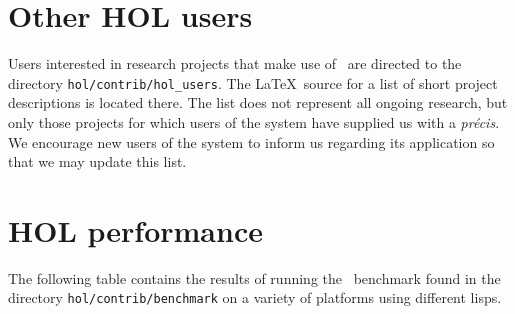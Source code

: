 {\section{Other HOL users}

Users interested in research projects that make use of \HOL\ are directed
to the directory {\small\tt hol/contrib/hol\_users}.  The \LaTeX\ source for a list
of short project descriptions is located there.  The list does not represent
all ongoing research, but only those projects for which users of the system
have supplied us with a {\it pr\'{e}cis}.  We encourage new users of the
system to inform us regarding its application so that we may update this list.

\section{HOL performance} \label{performance}

The following table contains the results of running the \HOL\ benchmark found
in the directory {\small\tt hol/contrib/benchmark} on a variety of platforms
using different lisps.

}
